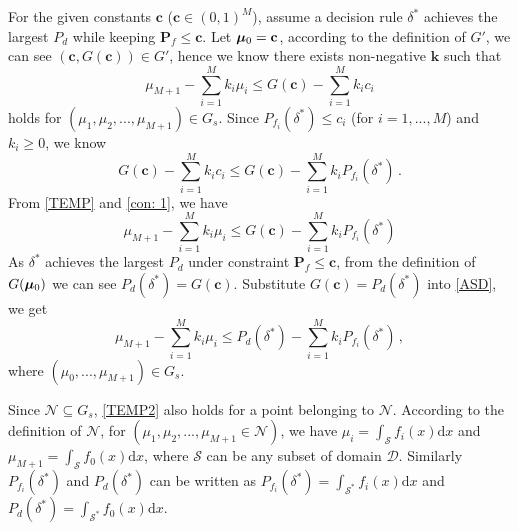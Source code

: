 For the given constants $\mathbf{c}$ ($\mathbf{c} \in (0, 1)^M$), 
 assume a decision rule $\delta^\ast$  achieves the largest $P_d$  while keeping $\mathbf{P}_f \leq \mathbf{c}$. 
Let $\boldsymbol{\mu}_0 = \mathbf{c}$, according to the definition of $G'$, we can see $(\mathbf{c},G(\mathbf{c})) \in G'$, hence we know there exists non-negative $\mathbf{k}$ such that 
\begin{equation}
\label{TEMP}
\mu_{M+1} - \sum_{i=1}^{M}k_i\mu_i \leq G(\mathbf{c}) - \sum_{i=1}^{M}k_ic_i
\end{equation}
holds for $(\mu_1, \mu_2, ..., \mu_{M+1}) \in G_s$.
Since $P_{f_i}(\delta^\ast) \leq c_i$ (for $i=1, ..., M$) and $k_i \geq 0$, we know
\begin{equation}
\label{con: 1}
 G(\mathbf{c}) - \sum_{i=1}^{M}k_ic_i \leq G(\mathbf{c}) - \sum_{i=1}^{M}k_iP_{f_i}(\delta^\ast)\,.
\end{equation}
From \eqref{TEMP} and \eqref{con: 1}, we have 
\begin{equation}
\label{ASD}
 \mu_{M+1} - \sum_{i=1}^{M}k_i\mu_i \leq G(\mathbf{c}) - \sum_{i=1}^{M}k_iP_{f_i}(\delta^\ast)
\end{equation}
As $\delta^\ast $ achieves the largest $P_d$ under constraint $\mathbf{P}_f \leq \mathbf{c}$, from the definition of $G(\boldsymbol{\mu}_0)$ we can see $P_{d}(\delta^\ast) = G(\mathbf{c})$. 
Substitute $G(\mathbf{c}) = P_d(\delta^\ast)$ into \eqref{ASD},  we get 
\begin{equation}
\label{TEMP2}
\mu_{M+1} - \sum_{i=1}^{M}k_i\mu_i \leq P_d(\delta^\ast) - \sum_{i=1}^{M}k_iP_{f_i}(\delta^\ast)\,,
\end{equation}
where $(\mu_0, ..., \mu_{M+1}) \in G_s$.

Since $\mathcal{N} \subseteq G_s$, \eqref{TEMP2} also holds for a point belonging to $\mathcal{N}$.
According to the definition of $\mathcal{N}$, for $(\mu_1, \mu_2, ..., \mu_{M+1} \in \mathcal{N})$, we have  
$\mu_i = \int_{\mathcal{S}}f_i(x)\mathrm{d}x$ and $
\mu_{M+1} = \int_{\mathcal{S}}f_{0}(x)\mathrm{d}x$,  
where $\mathcal{S}$ can be any subset of domain $\mathcal{D}$. 
Similarly 
$P_{f_i}(\delta^\ast)$ and $P_{d}(\delta^\ast)$ can be written as
$P_{f_i}(\delta^\ast) = \int_{\mathcal{S}^\ast}f_i(x)\mathrm{d}x$ and $
P_d(\delta^\ast) = \int_{\mathcal{S}^\ast}f_0(x)\mathrm{d}x$.

